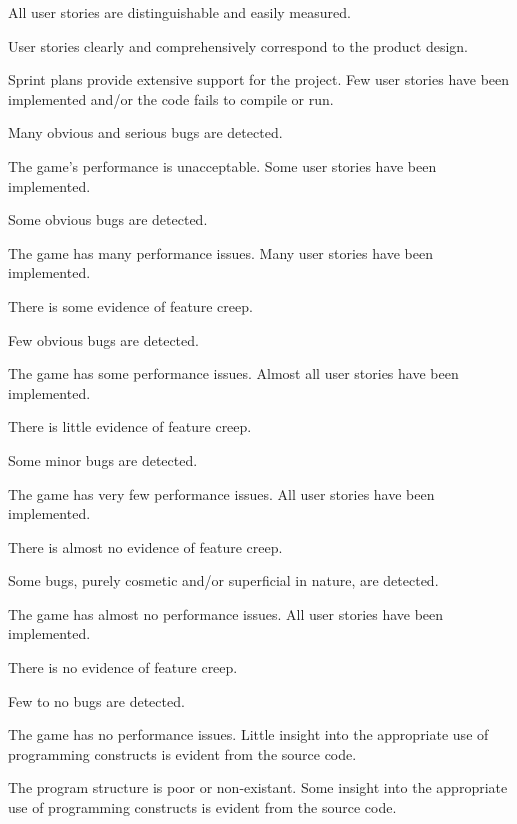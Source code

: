 \documentclass{../../fal_assignment}
\begin{document}
\begin{markingrubric}
        \grade All user stories are distinguishable and easily measured.
            \par User stories clearly and comprehensively correspond to the product design.
            \par Sprint plans provide extensive support for the project.
%
        \grade \fail Few user stories have been implemented  and/or the code fails to compile or run.
            \par Many obvious and serious bugs are detected.
            \par The game's performance is unacceptable.
        \grade Some user stories have been implemented.
            \par Some obvious bugs are detected.
            \par The game has many performance issues.
        \grade Many user stories have been implemented.
            \par There is some evidence of feature creep.
            \par Few obvious bugs  are detected.
            \par The game has some performance issues.
        \grade Almost all user stories have been implemented.
            \par There is little evidence of feature creep.
            \par Some minor bugs  are detected.
            \par The game has very few performance issues.
        \grade All user stories have been implemented.
            \par There is almost no evidence of feature creep.
            \par Some bugs, purely cosmetic and/or superficial in nature, are detected.
            \par The game has almost no performance issues.
        \grade All user stories have been implemented.
            \par There is no evidence of feature creep.
            \par Few to no bugs are detected.
            \par The game has no performance issues.
%
        \grade \fail Little insight into the appropriate use of programming constructs is evident from the source code.
            \par The program structure is poor or non-existant.
        \grade Some insight into the appropriate use of programming constructs is evident from the source code.

\end{markingrubric}
\end{document}
